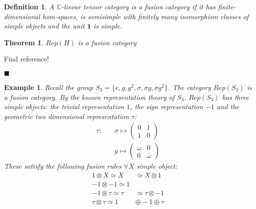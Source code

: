 \documentclass{article}
\newtheorem{definition}{Definition}
\newtheorem{example}{Example}
\newtheorem{theorem}{Theorem}
\newenvironment{proof}[1][Proof]{\begin{trivlist}
\item[\hskip \labelsep {\bfseries #1}]}{\begin{flushright}$\blacksquare$\end{flushright} \end{trivlist}}
\begin{document}
	\begin{definition}
		A $\mathbb{C}$-linear tensor category is a fusion category if it has finite-dimensional hom-spaces, is semisimple with finitely many isomorphism classes of simple objects and the unit $\mathbf{1}$ is simple.
	\end{definition}
	\begin{theorem}
		$Rep(H)$ is a fusion category
	\end{theorem}
	\begin{proof}
		Find reference!
	\end{proof}
	\begin{example}
		Recall the group $S_3=\{e, g, g^2, \sigma, \sigma g, \sigma g^2 \}$. The category $Rep(S_3)$ is a fusion category. By the known representation theory of $S_3$, $Rep(S_3)$ has three simple objects: the trivial representation $1$, the sign representation $-1$ and the geometric two dimensional representation $\tau$:
		\begin{equation*}
		\begin{split}
		\tau : \quad & \sigma \mapsto \left( {\begin{array}{cc} 0 & 1 \\ 1 & 0 \end{array}}\right) \\
		& g \mapsto \left( {\begin{array}{cc} \omega & 0 \\ 0 & \bar{\omega} \end{array}}\right)
		\end{split}
		\end{equation*}
		These satisfy the following fusion rules $\forall X$ simple object:
		\begin{equation}
		\begin{aligned}
		1 \otimes X \simeq X& \simeq X \otimes 1 \\
		-1 \otimes -1 \simeq 1& \\
		-1 \otimes \tau \simeq \tau& \simeq \tau \otimes -1 \\
		\tau \otimes \tau \simeq 1& \oplus -1 \oplus \tau 
		\end{aligned}
		\end{equation}		
	\end{example}
\end{document}
